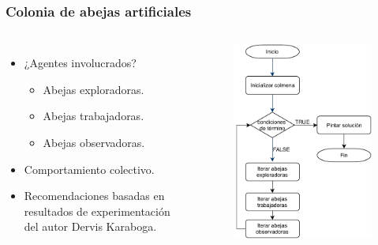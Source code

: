\begin{frame}
\frametitle{Colonia de abejas artificiales}

\begin{columns}

\begin{itemize}
\item ¿Agentes involucrados?
\pause
\begin{itemize}
\item Abejas exploradoras.
\item Abejas trabajadoras.
\item Abejas observadoras.
\end{itemize}
\pause
\item Comportamiento colectivo.
\pause

\item Recomendaciones basadas en resultados de experimentación del autor Dervis Karaboga.
\end{itemize}

{}
\begin{figure}
\includegraphics[scale=0.5]{./images/diagrama-flujo.pdf}
\end{figure}
{\onslide}

\end{columns}

\end{frame}